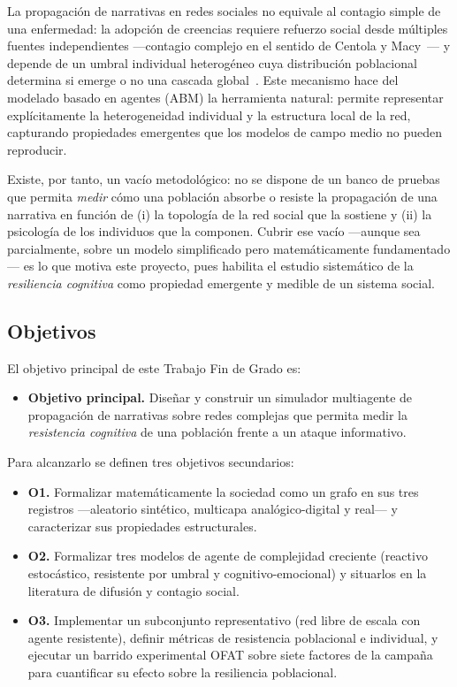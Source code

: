 \documentclass[12pt]{extarticle}
\numberwithin{equation}{section}
\begin{document}
La propagaci\'on de narrativas en redes sociales no equivale al contagio simple de una enfermedad: la adopci\'on de creencias requiere refuerzo social desde m\'ultiples fuentes independientes —contagio complejo en el sentido de Centola y Macy~\cite{CentolaMacy2007}— y depende de un umbral individual heterog\'eneo cuya distribuci\'on poblacional determina si emerge o no una cascada global~\cite{Granovetter1978,Watts2002}. Este mecanismo hace del modelado basado en agentes (ABM) la herramienta natural: permite representar expl\'icitamente la heterogeneidad individual y la estructura local de la red, capturando propiedades emergentes que los modelos de campo medio no pueden reproducir.

Existe, por tanto, un vac\'io metodol\'ogico: no se dispone de un banco de pruebas que permita \emph{medir} c\'omo una poblaci\'on absorbe o resiste la propagaci\'on de una narrativa en funci\'on de (i) la topolog\'ia de la red social que la sostiene y (ii) la psicolog\'ia de los individuos que la componen. Cubrir ese vac\'io —aunque sea parcialmente, sobre un modelo simplificado pero matem\'aticamente fundamentado— es lo que motiva este proyecto, pues habilita el estudio sistem\'atico de la \emph{resiliencia cognitiva} como propiedad emergente y medible de un sistema social.

\subsection{Objetivos}

El objetivo principal de este Trabajo Fin de Grado es:

\begin{itemize}
    \item \textbf{Objetivo principal.} Dise\~nar y construir un simulador multiagente de propagaci\'on de narrativas sobre redes complejas que permita medir la \emph{resistencia cognitiva} de una poblaci\'on frente a un ataque informativo.
\end{itemize}

Para alcanzarlo se definen tres objetivos secundarios:

\begin{itemize}
    \item \textbf{O1.} Formalizar matem\'aticamente la sociedad como un grafo en sus tres registros —aleatorio sint\'etico, multicapa anal\'ogico-digital y real— y caracterizar sus propiedades estructurales.
    \item \textbf{O2.} Formalizar tres modelos de agente de complejidad creciente (reactivo estoc\'astico, resistente por umbral y cognitivo-emocional) y situarlos en la literatura de difusi\'on y contagio social.
    \item \textbf{O3.} Implementar un subconjunto representativo (red libre de escala con agente resistente), definir m\'etricas de resistencia poblacional e individual, y ejecutar un barrido experimental OFAT sobre siete factores de la campa\~na para cuantificar su efecto sobre la resiliencia poblacional.
\end{itemize}
\end{document}
